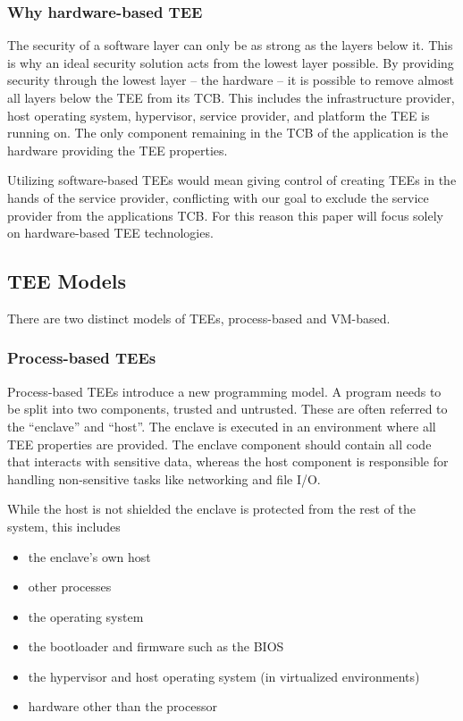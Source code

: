 \subsubsection{Why hardware-based TEE}

The security of a software layer can only be as strong as the layers below it.
This is why an ideal security solution acts from the lowest layer possible. By
providing security through the lowest layer -- the hardware -- it is possible to
remove almost all layers below the TEE from its TCB. This includes the
infrastructure provider, host operating system, hypervisor, service provider,
and platform the TEE is running on. The only component remaining in the TCB of
the application is the hardware providing the TEE properties.

Utilizing software-based TEEs would mean giving control of creating TEEs in the
hands of the service provider, conflicting with our goal to exclude the service
provider from the applications TCB. For this reason this paper will focus
solely on hardware-based TEE technologies.

\subsection{TEE Models}

There are two distinct models of TEEs, process-based and VM-based.

\subsubsection{Process-based TEEs}

Process-based TEEs introduce a new programming model. A program needs to be
split into two components, trusted and untrusted. These are often referred to
the ``enclave'' and ``host''. The enclave is executed in an environment where
all TEE properties are provided. The enclave component should contain all code
that interacts with sensitive data, whereas the host component is responsible
for handling non-sensitive tasks like networking and file I/O.

While the host is not shielded the enclave is protected from the rest of the
system, this includes

\begin{itemize}
  \item the enclave's own host
  \item other processes
  \item the operating system
  \item the bootloader and firmware such as the BIOS
  \item the hypervisor and host operating system (in virtualized environments)
  \item hardware other than the processor
\end{itemize}

